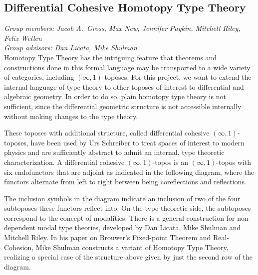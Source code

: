 \documentclass[a4paper,12pt]{article}
\begin{document}
\subsection*{Differential Cohesive Homotopy Type Theory}

\emph{Group members: Jacob A.\ Gross, Max New, Jennifer Paykin, Mitchell Riley, Felix Wellen} \\
\emph{Group advisors: Dan Licata, Mike Shulman} \\

Homotopy Type Theory has the intriguing feature that theorems and constructions done in this formal language
may be transported to a wide variety of categories, including $(\infty,1)$-toposes.
For this project, we want to extend the internal language of type theory to other toposes of interest to differential and algebraic geometry. In order to do so, plain homotopy type theory is not sufficient, since the differential geometric structure 
is not accessible internally without making changes to the type theory.

These toposes with additional structure, called differential cohesive $(\infty,1)$-toposes, have been used by Urs Schreiber to treat spaces of interest to modern physics
and are sufficiently abstract to admit an internal, type theoretic characterization. 
A differential cohesive $(\infty,1)$-topos is an $(\infty,1)$-topos with six endofunctors that are adjoint as indicated in the following diagram,
where the functors alternate from left to right between being coreflections and reflections.
\begin{center}
\end{center}
The inclusion symbols in the diagram indicate an inclusion of two of the four subtoposes these functors reflect into.
On the type theoretic side, the subtoposes correspond to the concept of modalities.
There is a general construction for non-dependent modal type theories, developed by Dan Licata, Mike Shulman and Mitchell Riley. 
In his paper on Brouwer's Fixed-point Theorem and Real-Cohesion, Mike Shulman constructs a variant of Homotopy Type Theory, 
realizing a special case of the structure above given by just the second row of the diagram.
\end{document}
